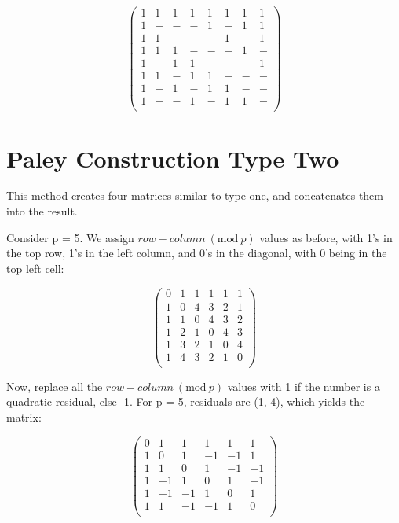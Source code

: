 \documentclass{article}
\newcommand{\Mod}[1]{\ (\mathrm{mod}\ #1)}
\begin{document}
\begin{equation}
\begin{pmatrix}
    1 & 1 & 1 & 1 & 1 & 1 & 1 & 1  \\
    1 & - & - & - & 1 & - & 1 & 1 \\
    1 & 1 & - & - & - & 1 & - & 1 \\
    1 & 1 & 1 & - & - & - & 1 & - \\
    1 & - & 1 & 1 & - & - & - & 1 \\
    1 & 1 & - & 1 & 1 & - & - & - \\
    1 & - & 1 & - & 1 & 1 & - & - \\
    1 & - & - & 1 & - & 1 & 1 & - \\
\end{pmatrix}
\end{equation}

\section{Paley Construction Type Two}

This method creates four matrices similar to type one, and concatenates them into the result.
    
Consider p = 5.  We assign $row - column\Mod{p}$ values as before, with 1's in the top row,
    1's in the left column, and 0's in the diagonal, with 0 being in the top left cell:

\begin{equation}
    \begin{pmatrix}
        0 & 1 & 1 & 1 & 1 & 1 \\
        1 & 0 & 4 & 3 & 2 & 1 \\
        1 & 1 & 0 & 4 & 3 & 2 \\
        1 & 2 & 1 & 0 & 4 & 3 \\
        1 & 3 & 2 & 1 & 0 & 4 \\
        1 & 4 & 3 & 2 & 1 & 0 \\
    \end{pmatrix}
\end{equation}

Now, replace all the $row - column\Mod{p}$ values with 1 if the number is a quadratic
residual, else -1.  For p = 5, residuals are (1, 4), which yields the matrix:

\begin{equation}
    \begin{pmatrix}
        0 & 1 & 1 & 1 & 1 & 1 \\
        1 & 0 & 1 & -1 & -1 & 1 \\
        1 & 1 & 0 & 1 & -1 & -1 \\
        1 & -1 & 1 & 0 & 1 & -1 \\
        1 & -1 & -1 & 1 & 0 & 1 \\
        1 & 1 & -1 & -1 & 1 & 0 \\
    \end{pmatrix}
\end{equation}
\end{document}
